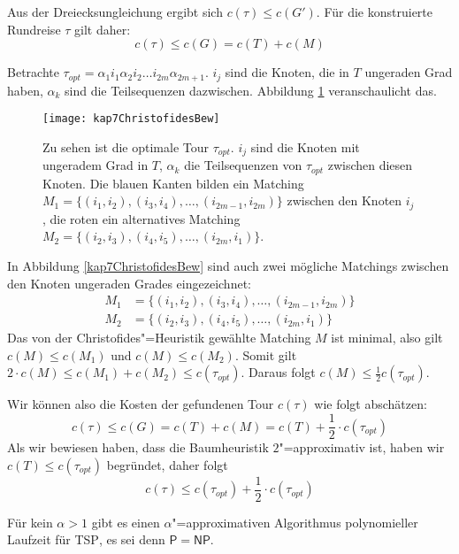 \begin{Bew}
  \hspace{\parindent}Aus der Dreiecksungleichung ergibt sich $c(\tau) \le c(G')$. Für die konstruierte Rundreise $\tau$ gilt daher:
  \[ c(\tau) \le c(G) = c(T) + c(M) \]
  
  Betrachte $\tau_{opt} = \alpha_1 i_1 \alpha_2 i_2 \ldots i_{2m} \alpha_{2m+1}$. $i_j$ sind die Knoten, die in $T$ ungeraden Grad haben, $\alpha_k$ sind die Teilsequenzen dazwischen. Abbildung \ref{kap7ChristofidesBew} veranschaulicht das.
  
  \begin{figure}[htb]
    \centering
    \texttt{[image: kap7ChristofidesBew]}
    \caption{Zu sehen ist die optimale Tour $\tau_{opt}$. $i_j$ sind die Knoten mit ungeradem Grad in $T$, $\alpha_k$ die Teilsequenzen von $\tau_{opt}$ zwischen diesen Knoten. Die blauen Kanten bilden ein Matching $M_1 = \{(i_1, i_2), (i_3, i_4), \ldots, (i_{2m-1}, i_{2m})\}$ zwischen den Knoten $i_j$, die roten ein alternatives Matching $M_2 = \{(i_2, i_3), (i_4, i_5), \ldots, (i_{2m}, i_1)\}$.}
    \label{kap7ChristofidesBew}
  \end{figure}
  
  In Abbildung \vref{kap7ChristofidesBew} sind auch zwei mögliche Matchings zwischen den Knoten ungeraden Grades eingezeichnet:
  \begin{align*}
    M_1 &= \{(i_1, i_2), (i_3, i_4), \ldots, (i_{2m-1}, i_{2m})\}\\
    M_2 &= \{(i_2, i_3), (i_4, i_5), \ldots, (i_{2m}, i_1)\}
  \end{align*}
   Das von der Christofides"=Heuristik gewählte Matching $M$ ist minimal, also gilt $c(M) \le c(M_1)$ und $c(M) \le c(M_2)$. Somit gilt $2 \cdot c(M) \le c(M_1) + c(M_2) \le c(\tau_{opt})$. Daraus folgt $c(M) \le \frac{1}{2} c(\tau_{opt})$.
   
   Wir können also die Kosten der gefundenen Tour $c(\tau)$ wie folgt abschätzen:
   \[ c(\tau) \le c(G) = c(T) + c(M) = c(T) + \frac{1}{2} \cdot c(\tau_{opt})\]
   Als wir bewiesen haben, dass die Baumheuristik $2$"=approximativ ist, haben wir $c(T) \le c(\tau_{opt})$ begründet, daher folgt
   \[ c(\tau) \le c(\tau_{opt}) + \frac{1}{2} \cdot c(\tau_{opt}) \]
\end{Bew}

\begin{Satz}
  \hspace{\parindent}Für kein $\alpha > 1$ gibt es einen $\alpha$"=approximativen Algorithmus polynomieller Laufzeit für \textsc{TSP}, es sei denn $\mathsf{P} = \mathsf{NP}$.
\end{Satz}


